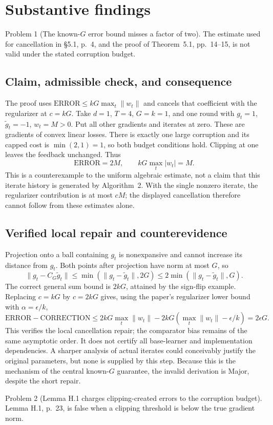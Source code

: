 \documentclass[10pt]{article}
\begin{document}
\section*{Substantive findings}
Problem 1 (The known-\(G\) error bound misses a factor of two).  The estimate used for cancellation in §5.1, p. 4, and the proof of Theorem 5.1, pp. 14–15, is not valid under the stated corruption budget.\par
\subsection*{Claim, admissible check, and consequence}
The proof uses \(\mathrm{ERROR}\le kG\max_t\|w_t\|\) and cancels that coefficient with the regularizer at \(c=kG\). Take \(d=1\), \(T=4\), \(G=k=1\), and one round with \(g_t=1\), \(\widetilde g_t=-1\), \(w_t=M>0\). Put all other gradients and iterates at zero. These are gradients of convex linear losses. There is exactly one large corruption and its capped cost is \(\min(2,1)=1\), so both budget conditions hold. Clipping at one leaves the feedback unchanged. Thus \[\mathrm{ERROR}=2M,\qquad kG\max_t|w_t|=M.\] This is a counterexample to the uniform algebraic estimate, not a claim that this iterate history is generated by Algorithm 2. With the single nonzero iterate, the regularizer contribution is at most \(cM\); the displayed cancellation therefore cannot follow from these estimates alone.\par
\subsection*{Verified local repair and counterevidence}
Projection onto a ball containing \(g_t\) is nonexpansive and cannot increase its distance from \(g_t\). Both points after projection have norm at most \(G\), so \[\|g_t-C_G\widetilde g_t\|
 \le\min(\|g_t-\widetilde g_t\|,2G)
 \le2\min(\|g_t-\widetilde g_t\|,G).\] The correct general sum bound is \(2kG\), attained by the sign-flip example. Replacing \(c=kG\) by \(c=2kG\) gives, using the paper’s regularizer lower bound with \(\alpha=\epsilon/k\), \[\mathrm{ERROR}-\mathrm{CORRECTION}
 \le2kG\max_t\|w_t\|-2kG(\max_t\|w_t\|-\epsilon/k)
 =2\epsilon G.\] This verifies the local cancellation repair; the comparator bias remains of the same asymptotic order. It does not certify all base-learner and implementation dependencies. A sharper analysis of actual iterates could conceivably justify the original parameters, but none is supplied by this step. Because this is the mechanism of the central known-\(G\) guarantee, the invalid derivation is Major, despite the short repair.\par
Problem 2 (Lemma H.1 charges clipping-created errors to the corruption budget).  Lemma H.1, p. 23, is false when a clipping threshold is below the true gradient norm.\par
\end{document}
